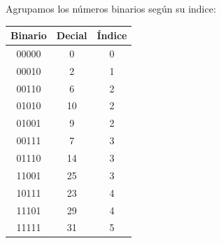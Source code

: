 \documentclass[a4paper,12pt]{article}
\begin{document}
\begin{enumerate}[label=\textcolor{teal}{\textbf{\arabic*.}}]
\begin{center}
\begin{tabular}{|c|c|c|c|}
            \end{tabular}
        \end{center}
        Agrupamos los números binarios según su indice:\\
        \begin{center}
            \begin{tabular}{|c|c|c|}
                \hline
                Binario & Decial & Índice\\ \hline
                00000 & 0 & 0 \\ \hline
                00010 & 2 & 1 \\ \hline  
                00110 & 6 & 2 \\ \hline 
                01010 & 10 & 2 \\ \hline
                01001 & 9 & 2 \\ \hline  
                00111 & 7 & 3 \\ \hline  
                01110 & 14 & 3 \\ \hline  
                11001 & 25 & 3 \\ \hline    
                10111 & 23 & 4 \\ \hline  
                11101 & 29 & 4 \\ \hline  
                11111 & 31 & 5 \\ \hline  
            \end{tabular}
        \end{center}
    


\end{enumerate}


\end{document}
